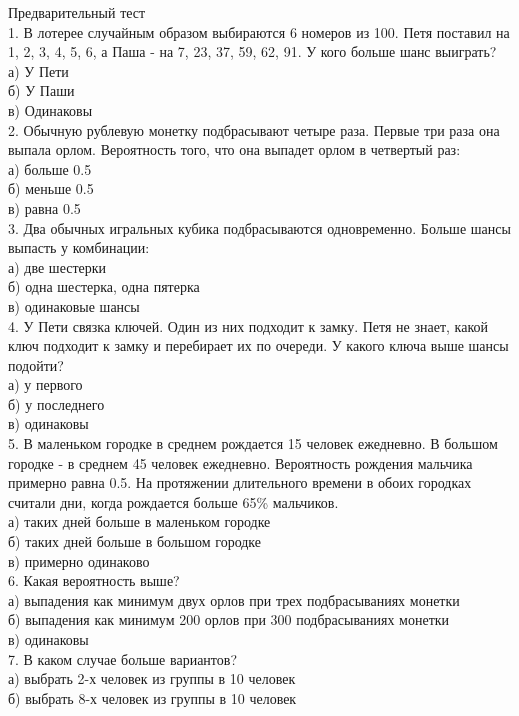 \documentclass[12pt,a4paper]{amsart}
\begin{document}
Предварительный тест \\
1. В лотерее случайным образом выбираются 6 номеров из 100. Петя поставил на 1, 2, 3, 4, 5, 6, а Паша - на 7, 23, 37, 59, 62, 91. У кого больше шанс выиграть? \\
а) У Пети \\
б) У Паши \\
в) Одинаковы \\
2. Обычную рублевую монетку подбрасывают четыре раза. Первые три раза она выпала орлом. Вероятность того, что она выпадет орлом в четвертый раз: \\
а) больше 0.5 \\
б) меньше 0.5 \\
в) равна 0.5 \\
3. Два обычных игральных кубика подбрасываются одновременно. Больше шансы выпасть у комбинации: \\
а) две шестерки \\
б) одна шестерка, одна пятерка \\
в) одинаковые шансы \\
4. У Пети связка ключей. Один из них подходит к замку. Петя не знает, какой ключ подходит к замку и перебирает их по очереди. У какого ключа выше шансы подойти? \\
а) у первого \\
б) у последнего \\
в) одинаковы \\
5. В маленьком городке в среднем рождается 15 человек ежедневно. В большом городке - в среднем 45 человек ежедневно. Вероятность рождения мальчика примерно равна 0.5. На протяжении длительного времени в обоих городках считали дни, когда рождается больше 65\% мальчиков. \\
а) таких дней больше в маленьком городке \\
б) таких дней больше в большом городке \\
в) примерно одинаково \\
6. Какая вероятность выше? \\
а) выпадения как минимум двух орлов при трех подбрасываниях монетки \\
б) выпадения как минимум 200 орлов при 300 подбрасываниях монетки \\
в) одинаковы \\
7. В каком случае больше вариантов? \\
а) выбрать 2-х человек из группы в 10 человек \\
б) выбрать 8-х человек из группы в 10 человек \\
\end{document}
